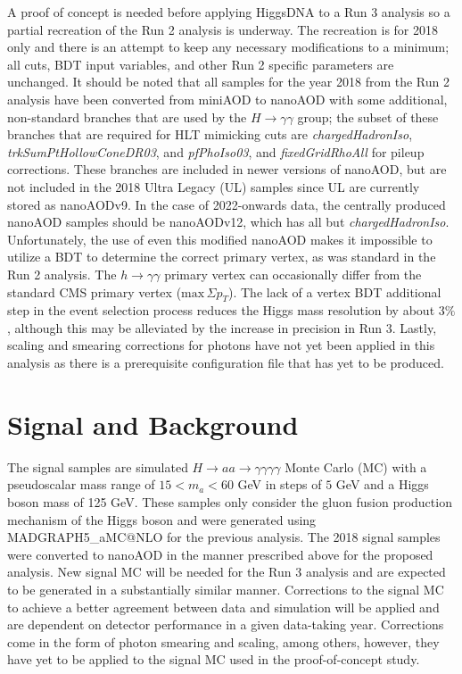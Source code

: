 \documentclass[12pt]{article}
\begin{document}
A proof of concept is needed before applying HiggsDNA to a Run 3 analysis so a partial recreation of the Run 2 analysis is underway. The recreation is for 2018 only and there is an attempt to keep any necessary modifications to a minimum; all cuts, BDT input variables, and other Run 2 specific parameters are unchanged. It should be noted that all samples for the year 2018 from the Run 2 analysis have been converted from miniAOD to nanoAOD with some additional, non-standard branches that are used by the $H \rightarrow \gamma\gamma$ group; the subset of these branches that are required for HLT mimicking cuts are \textit{chargedHadronIso}, \textit{trkSumPtHollowConeDR03}, and \textit{pfPhoIso03}, and \textit{fixedGridRhoAll} for pileup corrections. These branches are included in newer versions of nanoAOD, but are not included in the 2018 Ultra Legacy (UL) samples since UL are currently stored as nanoAODv9. In the case of 2022-onwards data, the centrally produced nanoAOD samples should be nanoAODv12, which has all but \textit{chargedHadronIso}. Unfortunately, the use of even this modified nanoAOD makes it impossible to utilize a BDT to determine the correct primary vertex, as was standard in the Run 2 analysis. The $h\rightarrow \gamma\gamma$ primary vertex can occasionally differ from the standard CMS primary vertex ($\mathrm{max}\,\Sigma p_T$). The lack of a vertex BDT additional step in the event selection process reduces the Higgs mass resolution by about $3\%$, although this may be alleviated by the increase in precision in Run 3. Lastly, scaling and smearing corrections for photons have not yet been applied in this analysis as there is a prerequisite configuration file that has yet to be produced.\par

\section{Signal and Background}
The signal samples are simulated $H \rightarrow aa \rightarrow \gamma\gamma\gamma\gamma$ Monte Carlo (MC) with a pseudoscalar mass range of $15 < m_a < 60$ GeV in steps of $5$ GeV and a Higgs boson mass of 125 GeV. These samples only consider the gluon fusion production mechanism of the Higgs boson and were generated using MADGRAPH5\_aMC@NLO for the previous analysis. The 2018 signal samples were converted to nanoAOD in the manner prescribed above for the proposed analysis. New signal MC will be needed for the Run 3 analysis and are expected to be generated in a substantially similar manner. Corrections to the signal MC to achieve a better agreement between data and simulation will be applied and are dependent on detector performance in a given data-taking year. Corrections come in the form of photon smearing and scaling, among others, however, they have yet to be applied to the signal MC used in the proof-of-concept study.\par
\end{document}

